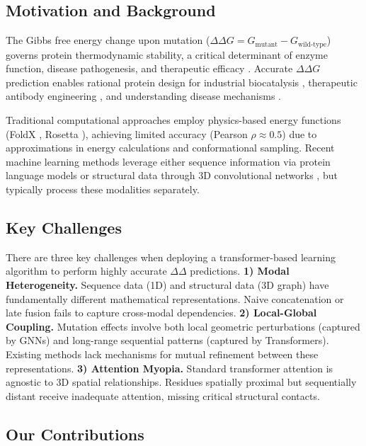 \documentclass[12pt,en]{elegantpaper}
\begin{document}
\subsection*{Motivation and Background}

The Gibbs free energy change upon mutation ($\Delta\Delta G = G_{\text{mutant}} -
G_{\text{wild-type}}$) governs protein thermodynamic stability, a critical
determinant of enzyme function, disease pathogenesis, and therapeutic efficacy
\cite{tokuriki2009stability}. Accurate $\Delta \Delta G$ prediction enables rational
protein design for industrial biocatalysis \cite{Braun2024,Braun2024.08.02.606416,Listov2025},
therapeutic antibody engineering \cite{Grinshpun01012021,Bashour2024}, and understanding
disease mechanisms \cite{yue2005loss}.

Traditional computational approaches employ physics-based energy functions
(FoldX \citep{schymkowitz2005foldx}, Rosetta \citep{kellogg2011role}), achieving
limited accuracy (Pearson $\rho \approx 0.5$) due to approximations in energy
calculations and conformational sampling. Recent machine learning methods
leverage either sequence information via protein language models
\citep{meier2021language} or structural data through 3D convolutional networks
\citep{li2020predicting}, but typically process these modalities separately.

\subsection*{Key Challenges}
There are three key challenges when deploying a transformer-based learning algorithm to perform highly accurate $\Delta\Delta$ predictions.
\textbf{1) Modal Heterogeneity.} Sequence data (1D) and structural data (3D graph) have fundamentally different mathematical representations. Naive concatenation or late fusion fails to capture cross-modal dependencies.
\textbf{2) Local-Global Coupling.} Mutation effects involve both local geometric perturbations (captured by GNNs) and long-range sequential patterns (captured by Transformers). Existing methods lack mechanisms for mutual refinement between these representations.
\textbf{3) Attention Myopia.} Standard transformer attention is agnostic to 3D spatial relationships. Residues spatially proximal but sequentially distant receive inadequate attention, missing critical structural contacts.

\subsection*{Our Contributions}
\end{document}
